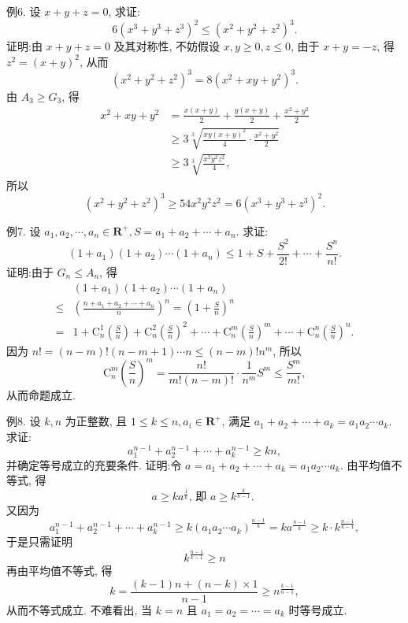 例6. 设 $x+y+z=0$, 求证:
$$
6\left(x^3+y^3+z^3\right)^2 \leqslant\left(x^2+y^2+z^2\right)^3 .
$$
证明:由 $x+y+z=0$ 及其对称性, 不妨假设 $x, y \geqslant 0, z \leqslant 0$, 由于 $x+y=-z$, 得 $z^2=(x+y)^2$, 从而
$$
\left(x^2+y^2+z^2\right)^3=8\left(x^2+x y+y^2\right)^3 .
$$
由 $A_3 \geqslant G_3$, 得
$$
\begin{aligned}
x^2+x y+y^2 & =\frac{x(x+y)}{2}+\frac{y(x+y)}{2}+\frac{x^2+y^2}{2} \\
& \geqslant 3 \sqrt[3]{\frac{x y(x+y)^2}{4} \cdot \frac{x^2+y^2}{2}} \\
& \geqslant 3 \sqrt[3]{\frac{x^2 y^2 z^2}{4}},
\end{aligned}
$$
所以
$$
\left(x^2+y^2+z^2\right)^3 \geqslant 54 x^2 y^2 z^2=6\left(x^3+y^3+z^3\right)^2 .
$$



例7. 设 $a_1, a_2, \cdots, a_n \in \mathbf{R}^{+}, S=a_1+a_2+\cdots+a_n$. 求证:
$$
\left(1+a_1\right)\left(1+a_2\right) \cdots\left(1+a_n\right) \leqslant 1+S+\frac{S^2}{2 !}+\cdots+\frac{S^n}{n !} .
$$
证明:由于 $G_n \leqslant A_n$, 得
$$
\begin{aligned}
& \left(1+a_1\right)\left(1+a_2\right) \cdots\left(1+a_n\right) \\
\leqslant & \left(\frac{n+a_1+a_2+\cdots+a_n}{n}\right)^n=\left(1+\frac{S}{n}\right)^n \\
= & 1+\mathrm{C}_n^1\left(\frac{S}{n}\right)+\mathrm{C}_n^2\left(\frac{S}{n}\right)^2+\cdots+\mathrm{C}_n^m\left(\frac{S}{n}\right)^m+\cdots+\mathrm{C}_n^n\left(\frac{S}{n}\right)^n .
\end{aligned}
$$
因为 $n !=(n-m) !(n-m+1) \cdots n \leqslant(n-m) ! n^m$,
所以
$$
\mathrm{C}_n^m\left(\frac{S}{n}\right)^m=\frac{n !}{m !(n-m) !} \cdot \frac{1}{n^m} S^m \leqslant \frac{S^m}{m !},
$$
从而命题成立.



例8. 设 $k, n$ 为正整数, 且 $1 \leqslant k \leqslant n, a_i \in \mathbf{R}^{+}$, 满足 $a_1+a_2+\cdots+ a_k=a_1 a_2 \cdots a_k$. 求证:
$$
a_1^{n-1}+a_2^{n-1}+\cdots+a_k^{n-1} \geqslant k n,
$$
并确定等号成立的充要条件.
证明:令 $a=a_1+a_2+\cdots+a_k=a_1 a_2 \cdots a_k$. 由平均值不等式, 得
$$
a \geqslant k a^{\frac{1}{k}} \text {, 即 } a \geqslant k^{\frac{k}{k-1}} \text {. }
$$
又因为
$$
a_1^{n-1}+a_2^{n-1}+\cdots+a_k^{n-1} \geqslant k\left(a_1 a_2 \cdots a_k\right)^{\frac{n-1}{k}}=k a^{\frac{n-1}{k}} \geqslant k \cdot k^{\frac{n-1}{k-1}},
$$
于是只需证明
$$
k^{\frac{n-1}{k-1}} \geqslant n
$$
再由平均值不等式, 得
$$
k=\frac{(k-1) n+(n-k) \times 1}{n-1} \geqslant n^{\frac{k-1}{n-1}},
$$
从而不等式成立.
不难看出, 当 $k=n$ 且 $a_1=a_2=\cdots=a_k$ 时等号成立.



